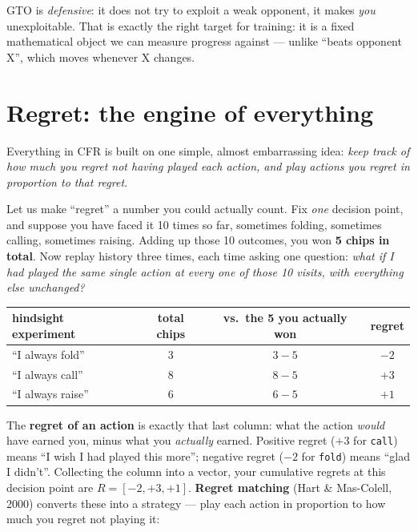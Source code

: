 \documentclass[11pt,a4paper]{article}
\begin{document}
\begin{intuition}
GTO is \emph{defensive}: it does not try to exploit a weak opponent, it makes
\emph{you} unexploitable. That is exactly the right target for training:
it is a fixed mathematical object we can measure progress against ---
unlike ``beats opponent X'', which moves whenever X changes.
\end{intuition}

\section{Regret: the engine of everything}

Everything in CFR is built on one simple, almost embarrassing idea:
\emph{keep track of how much you regret not having played each action, and
play actions you regret in proportion to that regret.}

Let us make ``regret'' a number you could actually count. Fix \emph{one}
decision point, and suppose you have faced it 10 times so far, sometimes
folding, sometimes calling, sometimes raising. Adding up those 10 outcomes,
you won \textbf{5 chips in total}. Now replay history three times, each time
asking one question: \emph{what if I had played the same single action at
every one of those 10 visits, with everything else unchanged?}

\begin{center}
\small
\begin{tabular}{@{}lccc@{}}
\toprule
hindsight experiment & total chips & vs.\ the 5 you actually won & regret \\
\midrule
``I always fold''  & 3 & $3-5$ & $-2$ \\
``I always call''  & 8 & $8-5$ & $+3$ \\
``I always raise'' & 6 & $6-5$ & $+1$ \\
\bottomrule
\end{tabular}
\end{center}

The \textbf{regret of an action} is exactly that last column: what the action
\emph{would} have earned you, minus what you \emph{actually} earned. Positive
regret ($+3$ for \texttt{call}) means ``I wish I had played this more'';
negative regret ($-2$ for \texttt{fold}) means ``glad I didn't''. Collecting
the column into a vector, your cumulative regrets at this decision point are
$R = [-2, +3, +1]$. \textbf{Regret matching} (Hart \& Mas-Colell, 2000)
converts these into a strategy --- play each action in proportion to how much
you regret not playing it:
\end{document}
